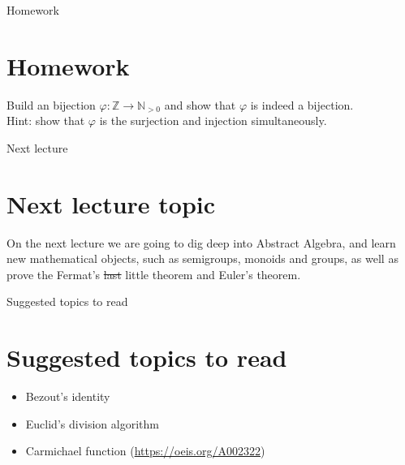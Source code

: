 \documentclass{beamer}
\begin{document}
\begin{frame}{Homework}
    \section{Homework}
    Build an bijection $\varphi : \mathbb{Z} \to \mathbb{N}_{>0}$ and show that $\varphi$ is indeed a bijection. \\ 
    Hint: show that $\varphi$ is the surjection and injection simultaneously.
\end{frame}

\begin{frame}{Next lecture}
    \section{Next lecture topic}
    On the next lecture we are going to dig deep into Abstract Algebra, and learn new mathematical objects, such as 
    semigroups, monoids and groups, as well as prove the Fermat's \st{last} little theorem and Euler's theorem.
\end{frame}

\begin{frame}{Suggested topics to read}
    \section{Suggested topics to read}
    \begin{itemize}
        \item Bezout's identity
        \item Euclid's division algorithm
        \item Carmichael function (\url{https://oeis.org/A002322})
    \end{itemize}    
\end{frame}
\end{document}
